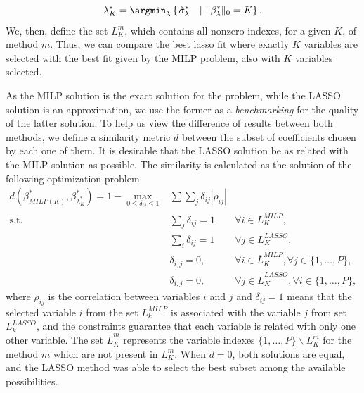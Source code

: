 \begin{equation}
\lambda^*_K = \argmin_\lambda \left\lbrace \left.  \hat{\sigma}_{\lambda}^{*} \quad  \right| \, \| \beta^*_\lambda \|_0 = K \right\rbrace.
\end{equation}
We, then, define the set $L_K^{m}$, which contains all nonzero indexes, for a given $K$, of method $m$.
Thus, we can compare the best lasso fit where exactly $K$ variables are selected with the best fit given by the MILP problem, also with $K$ variables selected.

As the MILP solution is the exact solution for the problem, while the LASSO solution is an approximation, we use the former as a \textit{benchmarking} for the quality of the latter solution. To help us view the difference of results between both methods, we define a similarity metric $d$ between the subset of coefficients chosen by each one of them. It is desirable that the LASSO solution be as related with the MILP solution as possible.
The similarity is calculated as the solution of the following optimization problem
\begin{eqnarray}
d(\beta^*_{MILP(K)}, \beta^*_{\lambda^*_K}) =	1 - \max_{0\leq\delta_{ij}\leq1} & \sum\sum_{j} \delta_{ij} |\rho_{ij}| \label{eq:metricad0} \\
\text{s.t.} & \sum_{j}\delta_{ij}=1 & \forall i\in L_{K}^{MILP},\\
& \sum_{i}\delta_{ij}=1 & \forall j\in L_{K}^{LASSO},\\
& \delta_{i,j} = 0, & \forall i \in \overline{L}_{K}^{MILP}, \forall j \in \{1,\dots,P\},\\
& \delta_{i,j} = 0, & \forall j \in \overline{L}_{K}^{LASSO}, \forall i \in \{1,\dots,P\},\label{eq:metricad4}
\end{eqnarray}
where $\rho_{ij}$ is the correlation between variables $i$ and $j$ and $\delta_{ij} = 1$ means that the selected variable $i$ from the set $L_k^{MILP}$ is associated with the variable $j$ from set $L_k^{LASSO}$, and the constraints guarantee that each variable is related with only one other variable. The set $\overline{L}_K^{m}$ represents the variable indexes $\{1,\dots,P\} \backslash {L}_K^{m}$ for the method $m$ which are not present in ${L}_K^{m}$.
When $d = 0$, both solutions are equal, and the LASSO method was able to select the best subset among the available possibilities.




